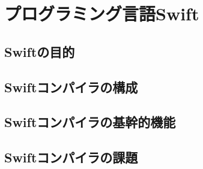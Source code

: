 \chapter{プログラミング言語Swift}
\label{explain-swift}

\section{Swiftの目的}
\label{explain-swift:purpose}

\section{Swiftコンパイラの構成}
\label{explain-swift:structure}

\section{Swiftコンパイラの基幹的機能}

\section{Swiftコンパイラの課題}

